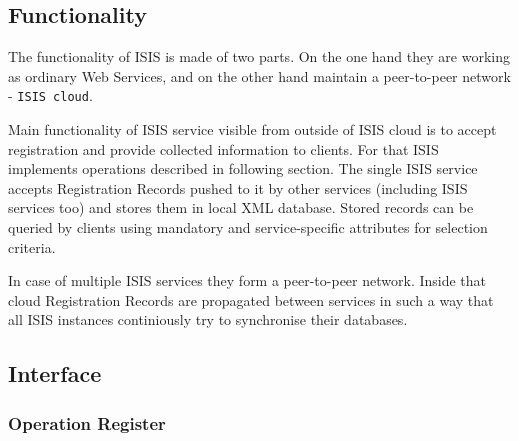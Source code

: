 \documentclass{book}
\begin{document}
\subsection{Functionality} %
\label{sub:isis_functionality}

 The functionality of ISIS is made of two parts. On the one hand they are working as ordinary Web Services, and on the other hand maintain a peer-to-peer network - \texttt{ISIS cloud}.

 Main functionality of ISIS service visible from outside of ISIS cloud is to accept registration and provide collected information to clients. For that ISIS implements operations described in following section.
The single ISIS service accepts Registration Records pushed to it by other services (including ISIS services too) and stores them in local XML database. Stored records can be queried by clients using mandatory and service-specific attributes for selection criteria.

 In case of multiple ISIS services they form a peer-to-peer network. Inside that cloud Registration Records are propagated between services in such a way that all ISIS instances continiously try to synchronise their databases.



\subsection{Interface} %
\label{sub:isis_interface}

\subsubsection{Operation Register}
\end{document}
